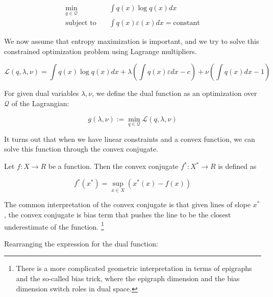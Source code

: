 \documentclass[a4paper]{article}
\begin{document}
\begin{equation}
  \begin{split}
    \min_{q \in \mathcal{Q} } \quad & \int q(x) \log q(x) dx \\
    \text{subject to} \quad & \int q(x) \varepsilon(x) dx = \text{constant}
  \end{split}
  \label{maxent}
\end{equation}

We now assume that entropy maximization is important, and we try to solve this constrained optimization problem using Lagrange multipliers.

\begin{equation}
  \mathcal{L}\left( q, \lambda, \nu \right) = \int q(x) \log q(x) dx  + \lambda \left( \int q(x) \varepsilon dx - c \right) + \nu \left( \int q(x) dx - 1 \right)
  \label{Lagrangian}
\end{equation}

For given dual variables $ \lambda, \nu$, we define the dual function as an optimization over $\mathcal{Q}$ of the Lagrangian:

\begin{equation}
  g(\lambda,\nu) := \min_{q \in \mathcal{Q} } \mathcal{L} \left( q, \lambda, \nu \right)
  \label{}
\end{equation}

It turns out that when we have linear constraints and a convex function, we can solve this function through the convex conjugate.

Let $f: X \rightarrow R $ be a function.  Then the convex conjugate $f^*: X^* \rightarrow R $ is defined as 

\begin{equation}
  f^*( x^* ) = \sup_{x \in X} \left( x^*(x) - f(x) \right)
  \label{convex conjugate}
\end{equation}

The common interpretation of the convex conjugate is that given lines of slope $x^*$, the convex conjugate is bias term that pushes the line to be the closest underestimate of the function.  \footnote{There is a more complicated geometric interpretation in terms of epigraphs and the so-called bias trick, where the epigraph dimension and the bias dimension switch roles in dual space.}

Rearranging the expression for the dual function:
\end{document}
